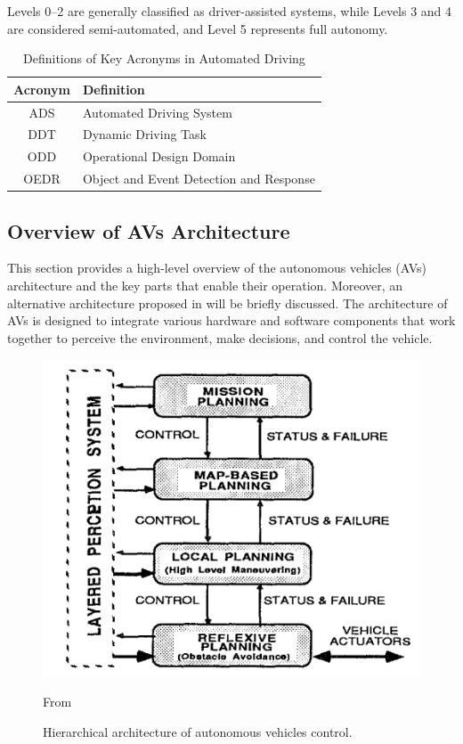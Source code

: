 Levels 0–2 are generally classified as driver-assisted systems, while Levels 3 and 4 are considered semi-automated, and Level 5 represents full autonomy.

\begin{table}[ht]
    \centering
    \begin{tabular}{|c|l|}
        \hline
        \textbf{Acronym} & \textbf{Definition} \\ \hline
        ADS & Automated Driving System \\ \hline
        DDT & Dynamic Driving Task \\ \hline
        ODD & Operational Design Domain \\ \hline
        OEDR & Object and Event Detection and Response \\ \hline
    \end{tabular}
    \caption{Definitions of Key Acronyms in Automated Driving}
    \label{tab:acronyms}
\end{table}

\subsection{Overview of AVs Architecture}\label{subsec:overview-on-avs-architecture}

This section provides a high-level overview of the autonomous vehicles (AVs) architecture and the key parts that enable their operation.
Moreover, an alternative architecture proposed in\cite{ahangar2021survey} will be briefly discussed.
The architecture of AVs is designed to integrate various hardware and software components that work together to perceive the environment, make decisions, and control the vehicle\cite{architecture}.

\begin{figure}[!htb]
    \centering
    \includegraphics[width=0.7\linewidth]{figures/state-architecture}
    \caption{Hierarchical architecture of autonomous vehicles control.}
    \footnotesize{From \cite{architecture} }
    \label{fig:architecture}
\end{figure}

